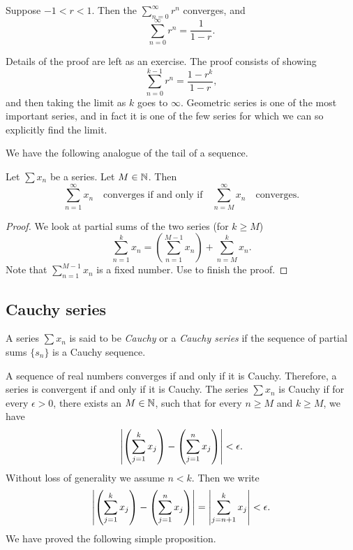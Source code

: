 \begin{prop} \label{geometric:prop}
Suppose
$-1 < r < 1$.  Then the \emph{}
$\sum_{n=0}^\infty r^n$ converges, and
\begin{equation*}
\sum_{n=0}^\infty r^n = \frac{1}{1-r} .
\end{equation*}
\end{prop}

Details of the proof are left as an exercise.
The proof consists of showing 
\begin{equation*}
\sum_{n=0}^{k-1} r^n = \frac{1-r^k}{1-r} ,
\end{equation*}
and then taking the limit as $k$ goes to $\infty$.
Geometric series is one of the most important series, and in fact it is
one of the few series for which we can so explicitly find the limit.

\medskip

We have the following analogue of the tail of a sequence.

\begin{prop}
Let $\sum x_n$ be a series.  Let $M \in {\mathbb{N}}$.  Then
\begin{equation*}
\sum_{n=1}^\infty x_n \quad \text{converges if and only if} \quad
\sum_{n=M}^\infty x_n \quad \text{converges.}
\end{equation*}
\end{prop}

\begin{proof}
We look at partial sums of the two series (for $k \geq M$)
\begin{equation*}
\sum_{n=1}^{k} x_n
=
\left(
\sum_{n=1}^{M-1} x_n
\right)
+
\sum_{n=M}^{k} x_n .
\end{equation*}
Note that 
$\sum_{n=1}^{M-1} x_n$ is a fixed number.  Use
 to finish the proof.
\end{proof}

\subsection{Cauchy series}

\begin{defn}
A series $\sum x_n$ is said to be \emph{Cauchy} or a
\emph{Cauchy series}
if the sequence of partial sums $\{ s_n \}$ is a Cauchy sequence.
\end{defn}

A sequence of real numbers converges if and only if it is
Cauchy.  Therefore, a series is convergent if and only if it is Cauchy.
The series $\sum x_n$ is Cauchy if for every $\epsilon > 0$,
there exists an $M \in {\mathbb{N}}$, such that for every $n \geq M$
and $k \geq M$, we have
\begin{equation*}
\left\lvert { \left( \sum_{j=1}^k x_j \right) - \left( \sum_{j=1}^n x_j \right) } \right\rvert
< \epsilon .
\end{equation*}
Without loss of generality we assume $n < k$.  Then we write
\begin{equation*}
\left\lvert { \left( \sum_{j=1}^k x_j \right) - \left( \sum_{j=1}^n x_j \right) } \right\rvert
=
\left\lvert { \sum_{j={n+1}}^k x_j } \right\rvert
< \epsilon .
\end{equation*}
We have proved the following simple proposition.


